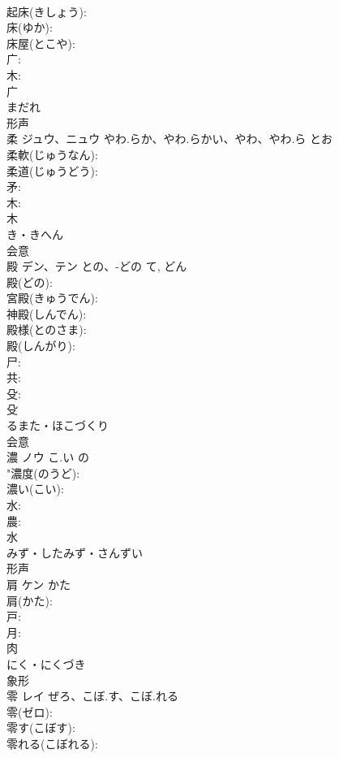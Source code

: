 \documentclass[8pt]{extreport}
\begin{document}
\begin{CJK}{UTF8}{min}
\\	起床(きしょう): 
\\	床(ゆか): 
\\	床屋(とこや): 
\\	广: 
\\	木: 
\\	广	
\\	まだれ	
\\	形声 
\\	柔	ジュウ、ニュウ	やわ.らか、やわ.らかい、やわ、やわ.ら	とお	
\\	柔軟(じゅうなん): 
\\	柔道(じゅうどう): 
\\	矛: 
\\	木: 
\\	木	
\\	き・きへん	
\\	会意 
\\	殿	デン、テン	との、-どの	て, どん	
\\	殿(どの): 
\\	宮殿(きゅうでん): 
\\	神殿(しんでん): 
\\	殿様(とのさま): 
\\	殿(しんがり): 
\\	尸: 
\\	共: 
\\	殳: 
\\	殳	
\\	るまた・ほこづくり	
\\	会意 
\\	濃	ノウ	こ.い	の	
\\	"濃度(のうど): 
\\	濃い(こい): 
\\	水: 
\\	農: 
\\	水	
\\	みず・したみず・さんずい	
\\	形声 
\\	肩	ケン	かた		
\\	肩(かた): 
\\	戸: 
\\	月: 
\\	肉	
\\	にく・にくづき	
\\	象形 
\\	零	レイ	ぜろ、こぼ.す、こぼ.れる		
\\	零(ゼロ): 
\\	零す(こぼす): 
\\	零れる(こぼれる): 

\end{CJK}
\end{document}
